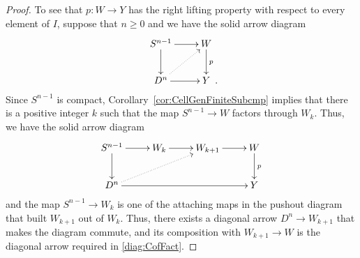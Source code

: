 \documentclass{amsart}
\numberwithin{equation}{section}
\theoremstyle{slplain}
\theoremstyle{definition}
\theoremstyle{remark}
\newcommand{\Period}{\rlap{\enspace .}}
\begin{document}
\begin{proof}
  To see that $p\colon W \to Y$ has the right lifting property with
  respect to every element of $I$, suppose that $n \ge 0$ and we have
  the solid arrow diagram
  \begin{equation}
    \label{diag:CofFact}
    \vcenter{
      \xymatrix{
        {S^{n-1}} \ar[r] \ar[d]
        & {W} \ar[d]^{p}\\
        {D^{n}} \ar[r] \ar@{..>}[ur]
        & {Y \Period}
      }%
    }%
  \end{equation}
  Since $S^{n-1}$ is compact, Corollary~\ref{cor:CellGenFiniteSubcmp} implies
  that there is a positive integer $k$ such that the map $S^{n-1} \to
  W$ factors through $W_{k}$.  Thus, we have the solid arrow diagram
  \begin{displaymath}
    \xymatrix{
      {S^{n-1}} \ar[r] \ar[d]
      & {W_{k}} \ar[r]
      & {W_{k+1}} \ar[r]
      & {W} \ar[d]^{p}\\
      {D^{n}} \ar@{..>}[urr] \ar[rrr]
      &&& {Y}
    }%
  \end{displaymath}
  and the map $S^{n-1} \to W_{k}$ is one of the attaching maps in the
  pushout diagram that built $W_{k+1}$ out of $W_{k}$.  Thus, there
  exists a diagonal arrow $D^{n} \to W_{k+1}$ that makes the diagram
  commute, and its composition with $W_{k+1} \to W$ is the diagonal
  arrow required in \eqref{diag:CofFact}.


\end{proof}
\end{document}
